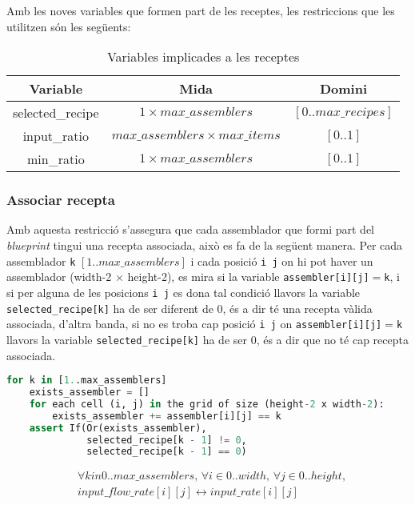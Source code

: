 Amb les noves variables que formen part de les receptes, les restriccions que les utilitzen són les següents:

\begin{table}[h]
    \centering
    \begin{tabular}{|c|c|c|}
    \hline
    \textbf{Variable} & \textbf{Mida} & \textbf{Domini} \\
    \hline
    selected\_recipe & $1 \times max\_assemblers$ & $[0..max\_recipes]$ \\
    \hline
    input\_ratio & $max\_assemblers \times max\_items$ & $[0..1]$ \\
    \hline
    min\_ratio & $1 \times max\_assemblers$ & $[0..1]$ \\
    \hline
    \end{tabular}
    \caption{Variables implicades a les receptes}
    \label{recipe-variables}
\end{table}

\subsubsection{Associar recepta}
Amb aquesta restricció s'assegura que cada assemblador que formi part del \textit{blueprint} tingui una recepta associada, això es fa de la següent manera. Per cada assemblador \texttt{k} $[1..max\_assemblers]$ i cada posició \texttt{i j} on hi pot haver un assemblador (width-2 $\times$ height-2), es mira si la variable \texttt{assembler[i][j]}$=$\texttt{k}, i si per alguna de les posicions \texttt{i j} es dona tal condició llavors la variable \texttt{selected\_recipe[k]} ha de ser diferent de 0, és a dir té una recepta vàlida associada, d'altra banda, si no es troba cap posició \texttt{i j} on \texttt{assembler[i][j]}$=$\texttt{k} llavors la variable \texttt{selected\_recipe[k]} ha de ser 0, és a dir que no té cap recepta associada.

\begin{lstlisting}[language=Python, caption=Associate Recipe]
for k in [1..max_assemblers]
    exists_assembler = []
    for each cell (i, j) in the grid of size (height-2 x width-2):
        exists_assembler += assembler[i][j] == k
    assert If(Or(exists_assembler),
              selected_recipe[k - 1] != 0,
              selected_recipe[k - 1] == 0)
\end{lstlisting}
\begin{align*}
    &\forall k in 0..max\_assemblers, \,  \forall i \in 0..width, \, \forall j \in 0..height, \\
    & input\_flow\_rate[i][j] \leftrightarrow input\_rate[i][j]
\end{align*}

